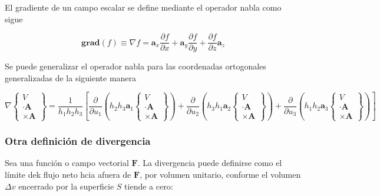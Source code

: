 El gradiente de un campo escalar se define mediante el operador nabla como sigue

\begin{equation*}
\textbf{grad}(f) \equiv  \nabla f = \mathbf{a}_x \frac{\partial f }{\partial  x} + \mathbf{a}_y \frac{\partial f }{\partial y } + \frac{\partial f }{\partial z }\mathbf{a}_z
\end{equation*}


Se puede generalizar el operador nabla para las coordenadas ortogonales generalizadas de la siguiente manera

\begin{equation*}
\nabla 
\left\{
\begin{aligned}
V \\
\cdot \mathbf{A} \\
\times \mathbf{A}
\end{aligned}
\right\} = \frac{1}{h_1 h_2 h_3} \left[ 
    \frac{\partial }{\partial u_1} \left( h_2 h_3 \mathbf{a}_1 
    \left\{
    \begin{aligned}
    V \\
    \cdot \mathbf{A} \\
    \times \mathbf{A}
    \end{aligned}
    \right\} \right) 
    + \frac{\partial }{\partial u_2} \left( h_3 h_1 \mathbf{a}_2 
    \left\{
    \begin{aligned}
    V \\
    \cdot \mathbf{A} \\
    \times \mathbf{A}
    \end{aligned}
    \right\} \right) 
    + \frac{\partial }{\partial u_3} \left( h_1 h_2 \mathbf{a}_3 
    \left\{
    \begin{aligned}
    V \\
    \cdot \mathbf{A} \\
    \times \mathbf{A}
    \end{aligned}
    \right\} \right) 
\right]
\end{equation*}


\subsubsection{Otra definición de divergencia}

Sea una función o campo vectorial $\mathbf{F}$. La divergencia puede definirse como el límite dek flujo neto hcia afuera de $\mathbf{F}$, por volumen unitario, conforme el volumen $\Delta v$ encerrado por la superficie $S$ tiende a cero:

